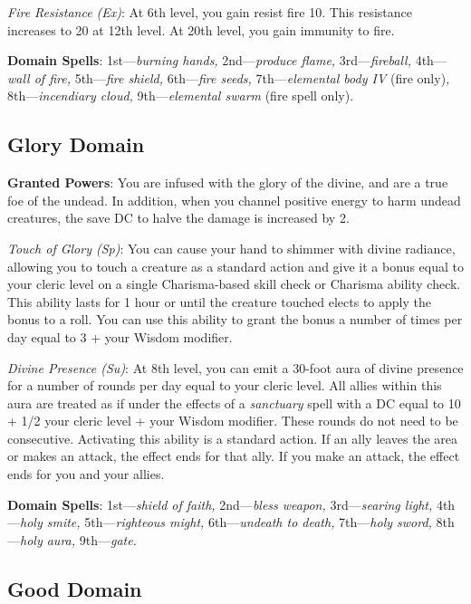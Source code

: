 \textit{Fire Resistance (Ex)}: At 6th level, you gain resist fire 10. This resistance increases to 20 at 12th
level. At 20th level, you gain immunity to fire.
				
\textbf{Domain Spells}: 1st---\textit{burning hands, }2nd---\textit{produce flame, }3rd---\textit{fireball, }4th---\textit{wall of fire, }5th---\textit{fire shield, }6th---\textit{fire seeds, }7th---\textit{elemental body IV }(fire only)\textit{, }8th---\textit{incendiary cloud, }9th---\textit{elemental swarm }(fire spell only).
				
\subsection{Glory Domain}

				
\textbf{Granted Powers}: You are infused with the glory of the divine, and are a true foe of the undead. In
addition, when you channel positive energy to harm undead creatures, the save DC to halve the damage is increased
by 2.
				
\textit{Touch of Glory (Sp)}: You can cause your hand to shimmer with divine radiance, allowing you to touch a
creature as a standard action and give it a bonus equal to your cleric level on a single Charisma-based skill
check or Charisma ability check. This ability lasts for 1 hour or until the creature touched elects to apply
the bonus to a roll. You can use this ability to grant the bonus a number of times per day equal to 3 + your
Wisdom modifier.
				
\textit{Divine Presence (Su)}: At 8th level, you can emit a 30-foot aura of divine presence for a number of rounds
per day equal to your cleric level. All allies within this aura are treated as if under the effects of a 
\textit{sanctuary }spell with a DC equal to 10 + 1/2 your cleric level + your Wisdom modifier. These rounds do
not need to be consecutive. Activating this ability is a standard action. If an ally leaves the area or makes 
an attack, the effect ends for that ally. If you make an attack, the effect ends for you and your allies.
				
\textbf{Domain Spells}: 1st---\textit{shield of faith, }2nd---\textit{bless weapon, }3rd---\textit{searing light, }4th---\textit{holy smite, }5th---\textit{righteous might, }6th---\textit{undeath to death, }7th---\textit{holy sword, }8th---\textit{holy aura, }9th---\textit{gate.}
				
\subsection{Good Domain}

